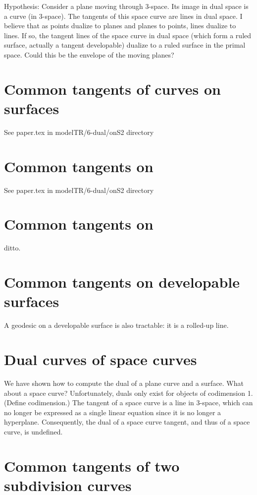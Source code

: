 \documentclass[9pt,twocolumn]{article}
\begin{document}
Hypothesis: Consider a plane moving through 3-space.
	Its image in dual space is a curve (in 3-space).
	The tangents of this space curve are lines in dual space.
	I believe that as points dualize to planes and planes to points,
	lines dualize to lines.
	If so, the tangent lines of the space curve in dual space
	(which form a ruled surface, actually a tangent developable)
	dualize to a ruled surface in the primal space.
	Could this be the envelope of the moving planes?

\section{Common tangents of curves on surfaces}

See paper.tex in modelTR/6-dual/onS2 directory

\section{Common tangents on }

See paper.tex in modelTR/6-dual/onS2 directory

\section{Common tangents on }

ditto.

\section{Common tangents on developable surfaces}

A geodesic on a developable surface is also tractable:
it is a rolled-up line.


\section{Dual curves of space curves}

We have shown how to compute the dual of a plane curve and a surface.
What about a space curve?
Unfortunately, duals only exist for objects of codimension 1.
(Define codimension.)
The tangent of a space curve is a line in 3-space, which can no longer
be expressed as a single linear equation since it is no longer a hyperplane.
Consequently, the dual of a space curve tangent, and thus of a space curve,
is undefined.

\section{Common tangents of two subdivision curves}
\end{document}
